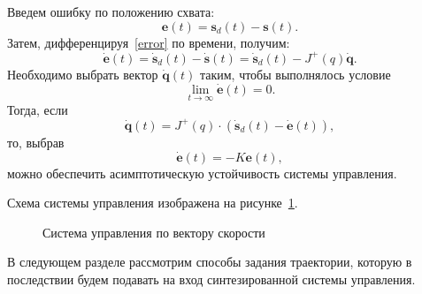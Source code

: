 Введем ошибку по положению схвата:
\begin{equation}\label{error}
	\bm{e}(t) = \bm{s}_d(t) - \bm{s}(t).
\end{equation}
Затем, дифференцируя~\eqref{error} по времени, получим:
\begin{equation}
	\dot{\bm{e}}(t) = \dot{\bm{s}}_d(t) - \dot{\bm{s}}(t) =
	\dot{\bm{s}}_d(t) - J^+(q) \dot{\bm{q}}.
\end{equation}
Необходимо выбрать вектор $ \dot{\bm{q}}(t) $ таким, чтобы выполнялось условие
\begin{equation}
	\lim_{t\to\infty} \dot{\bm{e}}(t) = 0.
\end{equation}
Тогда, если
\begin{equation}
	\dot{\bm{q}}(t) = J^+(q) \cdot (\dot{\bm{s}}_d(t) - \dot{\bm{e}}(t)),
\end{equation}
то, выбрав 
\begin{equation}
	\dot{\bm{e}}(t) = - K {\bm{e}}(t),
\end{equation}
можно обеспечить асимптотическую устойчивость системы управления.

Схема системы управления изображена на рисунке~\ref{img:velocity_control_system}.
\begin{figure}[h!]
	\caption{Система управления по вектору скорости}
	\label{img:velocity_control_system}
\end{figure}

В следующем разделе рассмотрим способы задания траектории, которую в последствии будем подавать на вход синтезированной системы управления.

